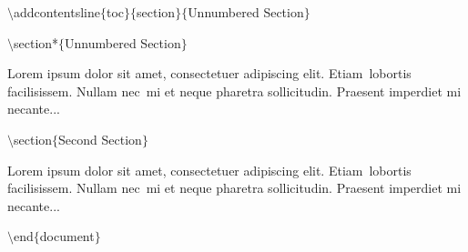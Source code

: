 $\setminus$addcontentsline$ \{ $toc$ \} $$ \{ $section$ \} $$ \{ $Unnumbered Section$ \} $\par

$\setminus$section*$ \{ $Unnumbered Section$ \} $\par


Lorem ipsum dolor sit amet, consectetuer adipiscing elit. Etiam~lobortis facilisissem.  Nullam nec~mi et neque pharetra sollicitudin.  Praesent imperdiet mi necante...\par



$\setminus$section$ \{ $Second Section$ \} $\par


Lorem ipsum dolor sit amet, consectetuer adipiscing elit. Etiam~lobortis facilisissem.  Nullam nec~mi et neque pharetra sollicitudin.  Praesent imperdiet mi necante...\par




\noindent  \hspace*{0.5in}$\setminus$end$ \{ $document$ \} $\par

